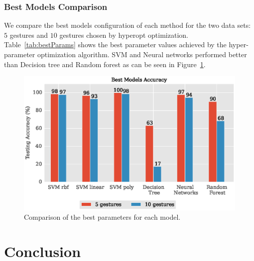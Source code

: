 \documentclass{article}
\begin{document}
\subsubsection{Best Models Comparison}

We compare the best models configuration of each method for the two data sets: $5$ gestures and $10$ gestures chosen by hyperopt optimization. Table~\ref{tab:bestParams} shows the best parameter values achieved by the hyper-parameter optimization algorithm. SVM and Neural networks performed better than Decision tree and Random forest as can be seen in Figure~\ref{fig:allModels_comparison}.


\begin{figure}[t]
\vskip 0.2in
\begin{center}
\centerline{\includegraphics[width=\columnwidth]{allModels_comparison.eps}}
\caption{Comparison of the best parameters for each model.}
\label{fig:allModels_comparison}
\end{center}
\vskip -0.2in
\end{figure}

\section{Conclusion}



\end{document}
